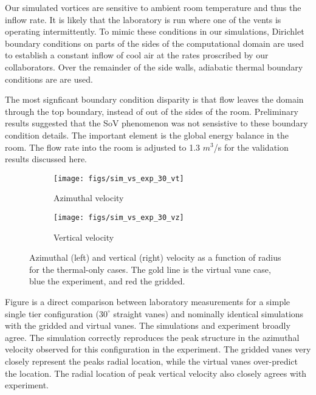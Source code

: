 Our simulated vortices are sensitive to ambient room temperature and thus 
the inflow rate. It is likely that the laboratory is run where one of
the vents is operating intermittently. 
To mimic these conditions in our simulations, Dirichlet boundary conditions 
on parts of the sides of the computational domain are used to
establish a constant inflow of cool air at the rates 
proscribed by our collaborators. Over the remainder of the side walls, 
adiabatic thermal boundary conditions are are used. 

The most signficant boundary condition disparity is that flow leaves the
domain through the top boundary, instead of out of the sides of the
room. Preliminary results suggested that the SoV phenomenon  was not
sensistive to these boundary condition details. The important element is
the  global energy balance in the room. The flow rate into the room is
adjusted to  1.3 $m^3$/s for the validation results discussed here.  


\begin{figure}[htp!]

 \begin{subfigure}{.5\textwidth}
  \centering
  \texttt{[image: figs/sim\_vs\_exp\_30\_vt]}
  \caption{Azimuthal velocity}
 \end{subfigure}%
 \begin{subfigure}{.5\textwidth}
  \centering
  \texttt{[image: figs/sim\_vs\_exp\_30\_vz]}%
  \caption{Vertical velocity} 
 \end{subfigure}%
  \caption{Azimuthal (left) and vertical (right) velocity 
 as a function of radius for the thermal-only cases. The gold line is
 the virtual vane case, blue the experiment, and red the gridded.} 
  \label{fig:val_lab}  
\end{figure}

Figure is a direct comparison between laboratory 
measurements for a simple single tier configuration ($30^{\circ}$
straight vanes) and nominally identical simulations with the gridded and
virtual vanes. The simulations and experiment broadly agree. The
simulation correctly reproduces the peak structure in the azimuthal
velocity observed for this configuration in the experiment. The gridded
vanes very closely represent the peaks radial location, while the
virtual vanes over-predict the location. The radial location of peak
vertical velocity also closely agrees with experiment.

